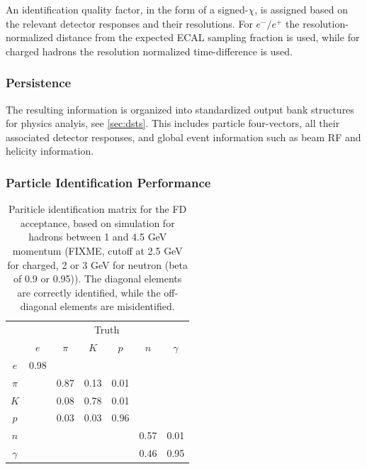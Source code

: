 An identification quality factor, in the form of a signed-$\chi$, is assigned based on the relevant detector responses and their resolutions.  For $e^-/e^+$ the resolution-normalized distance from the expected ECAL sampling fraction is used, while for charged hadrons the resolution normalized time-difference is used.

\subsubsection{Persistence}
The resulting information is organized into standardized output bank structures for physics analyis, see \ref{sec:dsts}.  This includes particle four-vectors, all their associated detector responses, and global event information such as beam RF and helicity information.


\subsubsection{Particle Identification Performance}

\begin{table}[htpb]
  \begin{center}
    \label{tab:pidmatrix}
    \begin{tabular}{|c|cccccc|}\hline
          & \multicolumn{6}{c|}{Truth}\\        
          & $e$  & $\pi$ & $K$  & $p$  & $n$  & $\gamma$ \\\hline
  $e$     & 0.98 &       &      &      &      &          \\ 
  $\pi$   &      &  0.87 & 0.13 & 0.01 &      &          \\ 
  $K$     &      &  0.08 & 0.78 & 0.01 &      &          \\ 
  $p$     &      &  0.03 & 0.03 & 0.96 &      &          \\ 
  $n$     &      &       &      &      & 0.57 &   0.01   \\ 
 $\gamma$ &      &       &      &      & 0.46 &   0.95   \\\hline 
    \end{tabular}
  \caption{Pariticle identification matrix for the FD acceptance, based on simulation for hadrons between 1 and 4.5 GeV momentum (FIXME, cutoff at 2.5 GeV for charged, 2 or 3 GeV for neutron (beta of 0.9 or 0.95)).  The diagonal elements are correctly identified, while the off-diagonal elements are misidentified.}
  \end{center}
\end{table}

